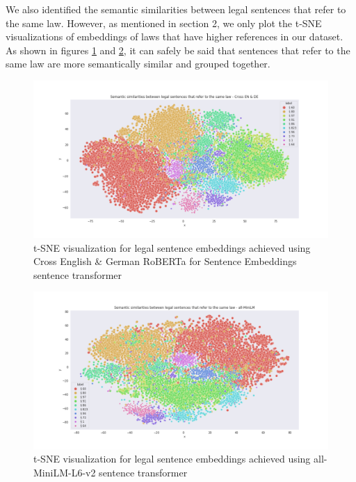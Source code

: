 \documentclass[runningheads]{llncs}
\begin{document}
We also identified the semantic similarities between legal sentences that refer to the same law. However, as mentioned in section 2, we only plot the t-SNE visualizations of embeddings of laws that have higher references in our dataset. As shown in figures \ref{fig:ts_embeddings} and \ref{fig:ml_embeddings}, it can safely be said that sentences that refer to the same law are more semantically similar and grouped together.

\begin{figure}[!h]
	\centering
	\includegraphics[width=1.0\linewidth]{images/ts_embeddings.png}
	\caption{t-SNE visualization for legal sentence embeddings achieved using Cross English \& German RoBERTa for Sentence Embeddings sentence transformer}
	\label{fig:ts_embeddings}
\end{figure}

\begin{figure}[!h]
	\centering
	\includegraphics[width=1.0\linewidth]{images/ml_embeddings.png}
	\caption{t-SNE visualization for legal sentence embeddings achieved using all-MiniLM-L6-v2 sentence transformer}
	\label{fig:ml_embeddings}
\end{figure}
\end{document}
